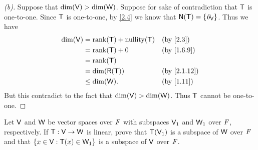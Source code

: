 \begin{proof}[(b)]
  Suppose that \(\dim(\mathsf{V}) > \dim(\mathsf{W})\).
  Suppose for sake of contradiction that \(\mathsf{T}\) is one-to-one.
  Since \(\mathsf{T}\) is one-to-one, by \cref{2.4} we know that \(\ns{\T} = \set{\zv_{\V}}\).
  Thus we have
  \begin{align*}
    \dim(\V) & = \rk{\T} + \nt{\T} &  & \text{(by \cref{2.3})}    \\
             & = \rk{\T} + 0       &  & \text{(by \cref{1.6.9})}  \\
             & = \rk{\T}                                          \\
             & = \dim(\rg{\T})     &  & \text{(by \cref{2.1.12})} \\
             & \leq \dim(\W).      &  & \text{(by \cref{1.11})}
  \end{align*}
  But this contradict to the fact that \(\dim(\mathsf{V}) > \dim(\mathsf{W})\).
  Thus \(\mathsf{T}\) cannot be one-to-one.
\end{proof}

\setcounter{ex}{19}
\begin{ex}\label{ex:2.1.20}
  Let \(\mathsf{V}\) and \(\mathsf{W}\) be vector spaces over \(\mathit{F}\) with subspaces \(\mathsf{V}_1\) and \(\mathsf{W}_1\) over \(\mathit{F}\), respectively.
  If \(\mathsf{T} : \mathsf{V} \to \mathsf{W}\) is linear, prove that \(\mathsf{T}(\mathsf{V}_1)\) is a subspace of \(\mathsf{W}\) over \(\mathit{F}\) and that \(\left\lbrace x \in \mathsf{V} : \mathsf{T}(x) \in \mathsf{W}_1\right\rbrace\) is a subspace of \(\mathsf{V}\) over \(\mathit{F}\).
\end{ex}

